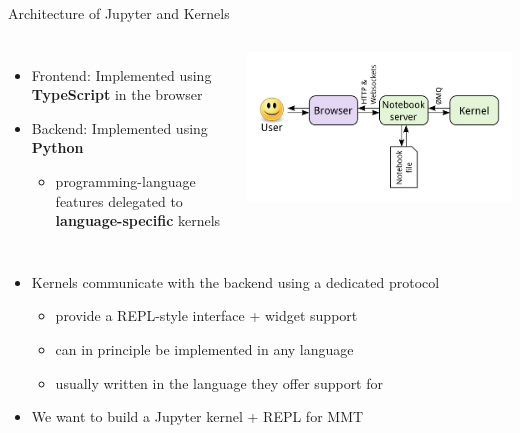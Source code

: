 \documentclass{beamer}
\begin{document}
    \begin{frame}{Architecture of Jupyter and Kernels}
        \begin{columns}
            \begin{itemize}
                \item Frontend: Implemented using \textbf{TypeScript} in the browser
                \item Backend: Implemented using \textbf{Python}
                \begin{itemize}
                    \item programming-language features delegated to \textbf{language-specific} kernels
                \end{itemize}
            \end{itemize}
            \centering
            \includegraphics[scale=0.25]{images/jupyterarch}
        \end{columns}
        \begin{itemize}
            \item Kernels communicate with the backend using a dedicated protocol
            \begin{itemize}
                \item provide a REPL-style interface + widget support
                \item can in principle be implemented in any language
                \item usually written in the language they offer support for
            \end{itemize}
            \item We want to build a Jupyter kernel + REPL for MMT
        \end{itemize}
        
    \end{frame}
\end{document}
